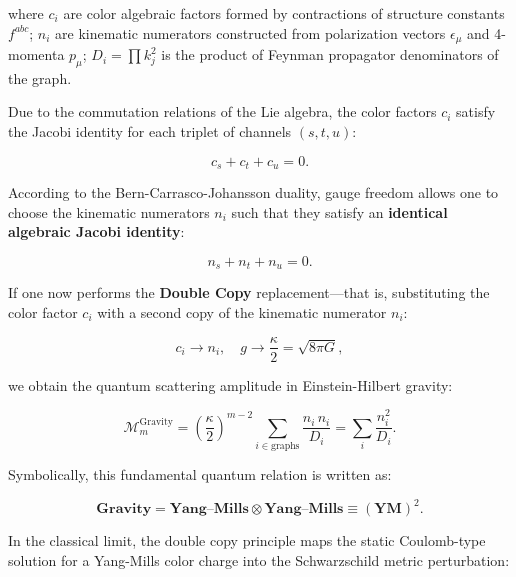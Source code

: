 where $c_i$ are color algebraic factors formed by contractions of structure constants $f^{abc}$;  
$n_i$ are kinematic numerators constructed from polarization vectors $\epsilon_\mu$ and 4-momenta $p_\mu$;  
$D_i = \prod k_j^2$ is the product of Feynman propagator denominators of the graph.

Due to the commutation relations of the Lie algebra, the color factors $c_i$ satisfy the Jacobi identity for each triplet of channels $(s, t, u)$:

\begin{equation}\label{eq:2.3.54}\tag{2.3.54}
c_s + c_t + c_u = 0.
\end{equation}

According to the Bern-Carrasco-Johansson duality, gauge freedom allows one to choose the kinematic numerators $n_i$ such that they satisfy an \textbf{identical algebraic Jacobi identity}:

\begin{equation}\label{eq:2.3.55}\tag{2.3.55}
n_s + n_t + n_u = 0.
\end{equation}

If one now performs the \textbf{Double Copy} replacement---that is, substituting the color factor $c_i$ with a second copy of the kinematic numerator $n_i$:

\begin{equation}\label{eq:2.3.56}\tag{2.3.56}
c_i \longrightarrow n_i, \quad g \longrightarrow \frac{\kappa}{2} = \sqrt{8\pi G},
\end{equation}

we obtain the quantum scattering amplitude in Einstein-Hilbert gravity:

\begin{equation}\label{eq:2.3.57}\tag{2.3.57}
\mathcal{M}_{m}^{\text{Gravity}} = \left( \frac{\kappa}{2} \right)^{m-2} \sum_{i \in \text{graphs}} \frac{n_i \, n_i}{D_i} = \sum_{i} \frac{n_i^2}{D_i}.
\end{equation}

Symbolically, this fundamental quantum relation is written as:

\begin{equation}\label{eq:2.3.58}\tag{2.3.58}
\mathbf{\text{Gravity}} = \mathbf{\text{Yang--Mills}} \otimes \mathbf{\text{Yang--Mills}} \equiv (\mathbf{\text{YM}})^2.
\end{equation}

In the classical limit, the double copy principle maps the static Coulomb-type solution for a Yang-Mills color charge into the Schwarzschild metric perturbation:

